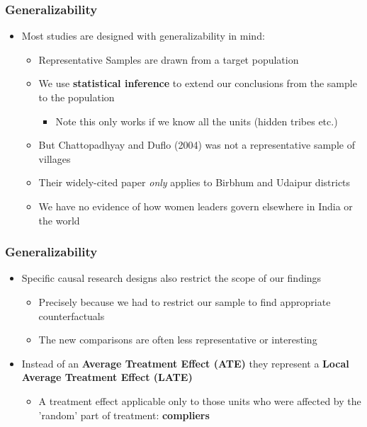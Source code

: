 \documentclass[xcolor=x11names,compress]{beamer}\usepackage[]{graphicx}\usepackage[]{color}
\renewcommand{\(}{\begin{columns}}
\renewcommand{\)}{\end{columns}}
\newcommand{\<}[1]{\begin{column}{#1}}
\renewcommand{\>}{\end{column}}
\begin{document}
\begin{frame}
\frametitle{Generalizability}
\begin{itemize}
\item Most studies are designed with generalizability in mind:
\pause
\begin{itemize}
\item Representative Samples are drawn from a target population
\pause
\item We use \textbf{statistical inference} to extend our conclusions from the sample to the population
\pause
\begin{itemize}
\item Note this only works if we know all the units (hidden tribes etc.)
\pause
\end{itemize}
\item But Chattopadhyay and Duflo (2004) was not a representative sample of villages
\pause
\item Their widely-cited paper \textit{only} applies to Birbhum and Udaipur districts
\pause
\item We have no evidence of how women leaders govern elsewhere in India or the world
\end{itemize}
\end{itemize}
\end{frame}

\begin{frame}
\frametitle{Generalizability}
\begin{itemize}
\item Specific causal research designs also restrict the scope of our findings
\pause
\begin{itemize}
\item Precisely because we had to restrict our sample to find appropriate counterfactuals
\pause
\item The new comparisons are often less representative or interesting
\pause
\end{itemize}
\item Instead of an \textbf{Average Treatment Effect (ATE)} they represent a \textbf{Local Average Treatment Effect (LATE)}
\pause
\begin{itemize}
\item A treatment effect applicable only to those units who were affected by the 'random' part of treatment: \textbf{compliers}
\end{itemize}
\end{itemize}
\end{frame}
\end{document}
